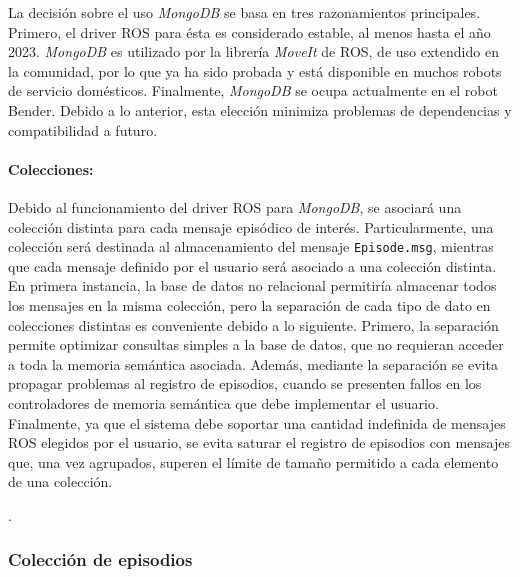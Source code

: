 La decisión sobre el uso \textit{MongoDB} se basa en tres razonamientos principales. Primero, el driver ROS para ésta es considerado estable, al menos hasta el año 2023. \textit{MongoDB} es utilizado por la librería \textit{MoveIt} de ROS, de uso extendido en la comunidad, por lo que ya ha sido probada y está disponible en muchos robots de servicio domésticos. Finalmente, \textit{MongoDB} se ocupa actualmente en el robot Bender. Debido a lo anterior, esta elección minimiza problemas de dependencias y compatibilidad a futuro.



\paragraph{Colecciones:}
Debido al funcionamiento del driver ROS para \textit{MongoDB}, se asociará una colección distinta para cada mensaje episódico de interés. Particularmente, una colección será destinada al almacenamiento del mensaje \texttt{Episode.msg}, mientras que cada mensaje definido por el usuario será  asociado a una colección distinta. En primera instancia, la base de datos no relacional permitiría almacenar todos los mensajes en la misma colección, pero la separación de cada tipo de dato en colecciones distintas es conveniente debido a lo siguiente. Primero, la separación permite optimizar consultas simples a la base de datos, que no requieran acceder a toda la memoria semántica asociada. Además, mediante la separación se evita propagar problemas al registro de episodios, cuando se presenten fallos en los controladores de memoria semántica que debe implementar el usuario. Finalmente, ya que el sistema debe soportar una cantidad indefinida de mensajes ROS elegidos por el usuario, se evita saturar el registro de episodios con mensajes que, una vez agrupados, superen el límite de tamaño permitido a cada elemento de una colección.

.


\subsubsection{Colección de episodios}


